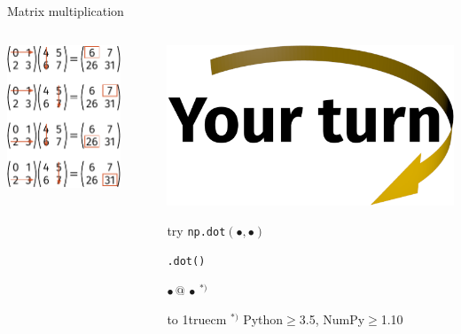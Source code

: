 \documentclass[svgnames]{beamer}
\begin{document}
\begin{frame}[fragile]{Matrix multiplication}
 \begin{columns}
  \begin{column}{0.6\textwidth}
   \begin{center}
    \includegraphics[width=0.8\textwidth]{matrixmult}
   \end{center}
  \end{column}%
  \begin{column}{0.4\textwidth}
   \includegraphics[width=3truecm]{yourturn}

   \vspace{0.4truecm}
   try \texttt{np.dot$(\bullet, \bullet)$}\\
   \strut\hphantom{try\ }\texttt{\bullet.dot(\bullet)}\\
   \strut\hphantom{try\ }\texttt{$\bullet\,@\,\bullet$}\,$^{*)}$
   
   \vspace{0.7truecm}
   \hbox to 1truecm{\hrulefill}
   \scriptsize{$^{*)}$ Python$\geq$3.5, NumPy$\geq$1.10}
   \vspace{1truecm}
  \end{column}
 \end{columns}
\end{frame}
\end{document}
